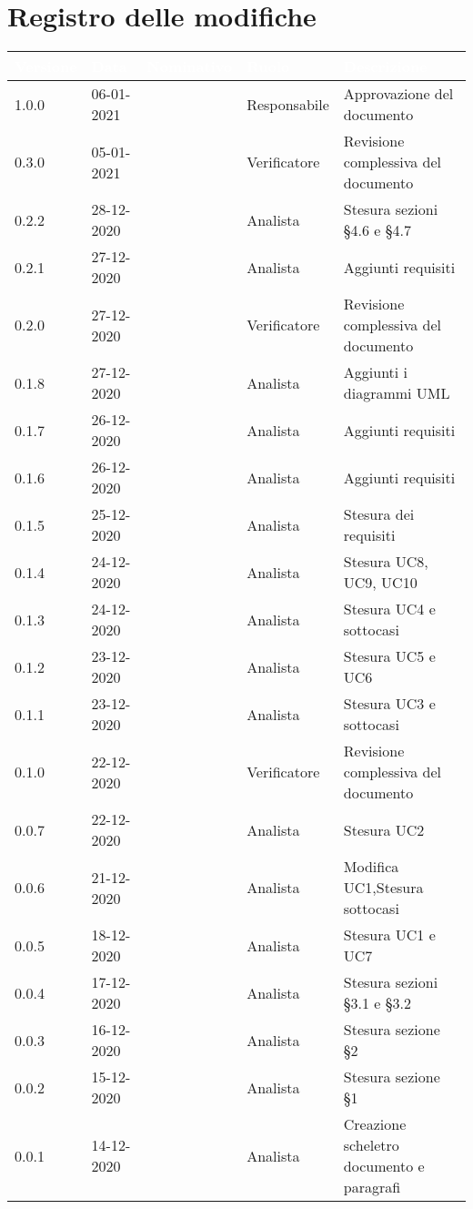\section*{Registro delle modifiche}
{
\setcounter{table}{-1}
{
\renewcommand{\arraystretch}{1.5}
\centering
\begin{longtable}{C{1.7cm} C{2.5cm} C{3.2cm} C{2.7cm} C{4.8cm}}
\textcolor{white}{\textbf{Versione}}&
\textcolor{white}{\textbf{Data}}&
\textcolor{white}{\textbf{Nominativo}}&
\textcolor{white}{\textbf{Ruolo}}&
\textcolor{white}{\textbf{Descrizione}}\\	
\endhead

1.0.0 & 06-01-2021 & \BM{} & Responsabile & Approvazione del documento \\

0.3.0 & 05-01-2021 & \PA{} & Verificatore & Revisione complessiva del documento \\

0.2.2 & 28-12-2020 & \BM{} & Analista & Stesura sezioni §4.6 e §4.7\\
0.2.1 & 27-12-2020 & \SG{} & Analista & Aggiunti requisiti\\

0.2.0 & 27-12-2020 & \RA{} & Verificatore & Revisione complessiva del documento \\

0.1.8 & 27-12-2020 & \SP{} & Analista & Aggiunti i diagrammi UML\\
0.1.7 & 26-12-2020 & \SP{} & Analista & Aggiunti requisiti\\
0.1.6 & 26-12-2020 & \BM{} & Analista & Aggiunti requisiti\\
0.1.5 & 25-12-2020 & \SG{} & Analista & Stesura dei requisiti \\
0.1.4 & 24-12-2020 & \SP{} & Analista & Stesura UC8, UC9, UC10\\
0.1.3 & 24-12-2020 & \SG{} & Analista & Stesura UC4 e sottocasi\\
0.1.2 & 23-12-2020 & \SP{} & Analista & Stesura UC5 e UC6\\

0.1.1 & 23-12-2020 & \BM{} & Analista & Stesura UC3 e sottocasi\\

0.1.0 & 22-12-2020 & \PA{} & Verificatore & Revisione complessiva del documento \\

0.0.7 & 22-12-2020 & \SG{} & Analista & Stesura UC2\\
0.0.6 & 21-12-2020 & \BM{} & Analista & Modifica UC1,\newline Stesura sottocasi\\
0.0.5 & 18-12-2020 & \SP{} & Analista & Stesura UC1 e UC7\\
0.0.4 & 17-12-2020 & \SP{} & Analista & Stesura sezioni §3.1 e §3.2\\	
0.0.3 & 16-12-2020 & \SP{} & Analista & Stesura sezione §2\\
0.0.2 & 15-12-2020 & \SP{} & Analista & Stesura sezione §1\\
0.0.1 & 14-12-2020 & \SP{} & Analista & Creazione scheletro documento e paragrafi\\
		
\end{longtable}
}
}
